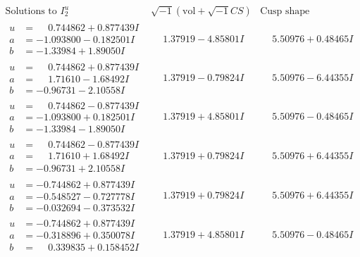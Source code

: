 \documentclass[1p]{elsarticle_modified}
\theoremstyle{definition}
\newcommand{\I}{\sqrt{-1}}
\begin{document}
$$\begin{array}{c|c|c}  
\text{Solutions to }I^u_{2}& \I (\text{vol} + \sqrt{-1}CS) & \text{Cusp shape}\\
 \hline 
\begin{aligned}
u &= \phantom{-}0.744862 + 0.877439 I \\
a &= -1.093800 - 0.182501 I \\
b &= -1.33984 + 1.89050 I\end{aligned}
 & \phantom{-}1.37919 - 4.85801 I & \phantom{-}5.50976 + 0.48465 I \\ \hline\begin{aligned}
u &= \phantom{-}0.744862 + 0.877439 I \\
a &= \phantom{-}1.71610 - 1.68492 I \\
b &= -0.96731 - 2.10558 I\end{aligned}
 & \phantom{-}1.37919 - 0.79824 I & \phantom{-}5.50976 - 6.44355 I \\ \hline\begin{aligned}
u &= \phantom{-}0.744862 - 0.877439 I \\
a &= -1.093800 + 0.182501 I \\
b &= -1.33984 - 1.89050 I\end{aligned}
 & \phantom{-}1.37919 + 4.85801 I & \phantom{-}5.50976 - 0.48465 I \\ \hline\begin{aligned}
u &= \phantom{-}0.744862 - 0.877439 I \\
a &= \phantom{-}1.71610 + 1.68492 I \\
b &= -0.96731 + 2.10558 I\end{aligned}
 & \phantom{-}1.37919 + 0.79824 I & \phantom{-}5.50976 + 6.44355 I \\ \hline\begin{aligned}
u &= -0.744862 + 0.877439 I \\
a &= -0.548527 - 0.727778 I \\
b &= -0.032694 - 0.373532 I\end{aligned}
 & \phantom{-}1.37919 + 0.79824 I & \phantom{-}5.50976 + 6.44355 I \\ \hline\begin{aligned}
u &= -0.744862 + 0.877439 I \\
a &= -0.318896 + 0.350078 I \\
b &= \phantom{-}0.339835 + 0.158452 I\end{aligned}
 & \phantom{-}1.37919 + 4.85801 I & \phantom{-}5.50976 - 0.48465 I \\ \hline\begin{aligned}

\end{aligned}
\end{array}$$
\end{document}
